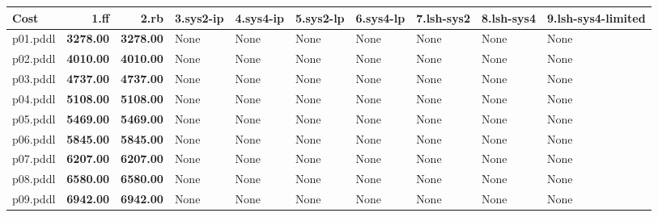 \documentclass{article}
\begin{document}
\begin{tabular}{@{}lrrrrrrrrr@{}}
Cost & 1.ff & 2.rb & 3.sys2-ip & 4.sys4-ip & 5.sys2-lp & 6.sys4-lp & 7.lsh-sys2 & 8.lsh-sys4 & 9.lsh-sys4-limited \\
\midrule
p01.pddl & \textbf{3278.00} & \textbf{3278.00} & \multicolumn{1}{|l|}{None} & \multicolumn{1}{|l|}{None} & \multicolumn{1}{|l|}{None} & \multicolumn{1}{|l|}{None} & \multicolumn{1}{|l|}{None} & \multicolumn{1}{|l|}{None} & \multicolumn{1}{|l|}{None} \\
p02.pddl & \textbf{4010.00} & \textbf{4010.00} & \multicolumn{1}{|l|}{None} & \multicolumn{1}{|l|}{None} & \multicolumn{1}{|l|}{None} & \multicolumn{1}{|l|}{None} & \multicolumn{1}{|l|}{None} & \multicolumn{1}{|l|}{None} & \multicolumn{1}{|l|}{None} \\
p03.pddl & \textbf{4737.00} & \textbf{4737.00} & \multicolumn{1}{|l|}{None} & \multicolumn{1}{|l|}{None} & \multicolumn{1}{|l|}{None} & \multicolumn{1}{|l|}{None} & \multicolumn{1}{|l|}{None} & \multicolumn{1}{|l|}{None} & \multicolumn{1}{|l|}{None} \\
p04.pddl & \textbf{5108.00} & \textbf{5108.00} & \multicolumn{1}{|l|}{None} & \multicolumn{1}{|l|}{None} & \multicolumn{1}{|l|}{None} & \multicolumn{1}{|l|}{None} & \multicolumn{1}{|l|}{None} & \multicolumn{1}{|l|}{None} & \multicolumn{1}{|l|}{None} \\
p05.pddl & \textbf{5469.00} & \textbf{5469.00} & \multicolumn{1}{|l|}{None} & \multicolumn{1}{|l|}{None} & \multicolumn{1}{|l|}{None} & \multicolumn{1}{|l|}{None} & \multicolumn{1}{|l|}{None} & \multicolumn{1}{|l|}{None} & \multicolumn{1}{|l|}{None} \\
p06.pddl & \textbf{5845.00} & \textbf{5845.00} & \multicolumn{1}{|l|}{None} & \multicolumn{1}{|l|}{None} & \multicolumn{1}{|l|}{None} & \multicolumn{1}{|l|}{None} & \multicolumn{1}{|l|}{None} & \multicolumn{1}{|l|}{None} & \multicolumn{1}{|l|}{None} \\
p07.pddl & \textbf{6207.00} & \textbf{6207.00} & \multicolumn{1}{|l|}{None} & \multicolumn{1}{|l|}{None} & \multicolumn{1}{|l|}{None} & \multicolumn{1}{|l|}{None} & \multicolumn{1}{|l|}{None} & \multicolumn{1}{|l|}{None} & \multicolumn{1}{|l|}{None} \\
p08.pddl & \textbf{6580.00} & \textbf{6580.00} & \multicolumn{1}{|l|}{None} & \multicolumn{1}{|l|}{None} & \multicolumn{1}{|l|}{None} & \multicolumn{1}{|l|}{None} & \multicolumn{1}{|l|}{None} & \multicolumn{1}{|l|}{None} & \multicolumn{1}{|l|}{None} \\
p09.pddl & \textbf{6942.00} & \textbf{6942.00} & \multicolumn{1}{|l|}{None} & \multicolumn{1}{|l|}{None} & \multicolumn{1}{|l|}{None} & \multicolumn{1}{|l|}{None} & \multicolumn{1}{|l|}{None} & \multicolumn{1}{|l|}{None} & \multicolumn{1}{|l|}{None} \\

\end{tabular}
\end{document}
